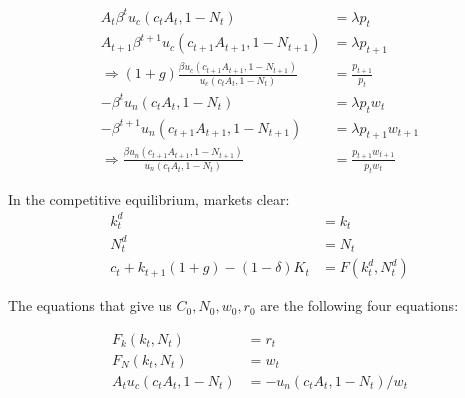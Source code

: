 \documentclass[11pt]{article} %
\begin{document}
\begin{align*}
A_t\beta^tu_c(c_tA_t,1-N_t) &= \lambda p_t\\
A_{t+1}\beta^{t+1}u_c(c_{t+1}A_{t+1},1-N_{t+1}) &= \lambda p_{t+1}\\
\Rightarrow (1+g)\frac{\beta u_c(c_{t+1}A_{t+1},1-N_{t+1})}{ u_c(c_tA_t,1-N_t)} &= \frac{p_{t+1}}{p_t}\\
-\beta^tu_n(c_tA_t,1-N_t) &= \lambda p_tw_t \\
-\beta^{t+1}u_n(c_{t+1}A_{t+1},1-N_{t+1}) &= \lambda p_{t+1}w_{t+1}\\
\Rightarrow \frac{\beta u_n(c_{t+1}A_{t+1},1-N_{t+1}) }{u_n(c_tA_t,1-N_t)} &= \frac{p_{t+1} w_{t+1}}{p_t w_t}
\end{align*}

In the competitive equilibrium, markets clear:
\begin{align*}
k_t^d &= k_t\\
N_t^d &= N_t\\
c_t + k_{t+1}(1+g) - (1-\delta)K_{t} &= F(k_t^d,N_t^d)
\end{align*}

The equations that give us $C_0,N_0,w_0,r_0$ are the following four equations:

\begin{align}
F_k(k_t,N_t) &= r_t\\
F_N(k_t,N_t) &= w_t\\
A_t u_c (c_t A_t, 1-N_t) &= - u_n (c_tA_t,1-N_t) / w_t
\end{align}
\end{document}
